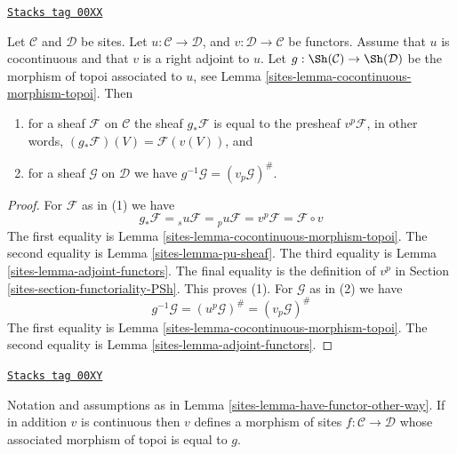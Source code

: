 \begin{lemma}
\label{sites-lemma-have-functor-other-way}
\href{https://stacks.math.columbia.edu/tag/00XX}{\texttt{Stacks tag 00XX}}

Let $\mathcal{C}$ and $\mathcal{D}$ be sites. Let
$u : \mathcal{C} \to \mathcal{D}$, and $v : \mathcal{D} \to \mathcal{C}$
be functors. Assume that $u$ is cocontinuous
and that $v$ is a right adjoint to $u$.
Let $g : \Sh(\mathcal{C}) \to \Sh(\mathcal{D})$ be
the morphism of topoi associated to $u$, see
Lemma \ref{sites-lemma-cocontinuous-morphism-topoi}.
Then
\begin{enumerate}
\item for a sheaf $\mathcal{F}$ on $\mathcal{C}$ the sheaf
$g_*\mathcal{F}$ is equal to the presheaf $v^p\mathcal{F}$, in other words,
$(g_*\mathcal{F})(V) = \mathcal{F}(v(V))$, and
\item for a sheaf $\mathcal{G}$ on $\mathcal{D}$ we have
$g^{-1}\mathcal{G} = (v_p\mathcal{G})^\#$.
\end{enumerate}
\end{lemma}

\begin{proof}

For $\mathcal{F}$ as in (1) we have
$$
g_*\mathcal{F} =
{}_su\mathcal{F} =
{}_pu\mathcal{F} =
v^p\mathcal{F} =
\mathcal{F} \circ v
$$
The first equality is Lemma \ref{sites-lemma-cocontinuous-morphism-topoi}.
The second equality is Lemma \ref{sites-lemma-pu-sheaf}.
The third equality is Lemma \ref{sites-lemma-adjoint-functors}.
The final equality is the definition of $v^p$ in
Section \ref{sites-section-functoriality-PSh}. This proves (1).
For $\mathcal{G}$ as in (2) we have
$$
g^{-1}\mathcal{G} = (u^p\mathcal{G})^\# = (v_p\mathcal{G})^\#
$$
The first equality is Lemma \ref{sites-lemma-cocontinuous-morphism-topoi}.
The second equality is Lemma \ref{sites-lemma-adjoint-functors}.
\end{proof}

\begin{lemma}
\label{sites-lemma-have-functor-other-way-morphism}
\href{https://stacks.math.columbia.edu/tag/00XY}{\texttt{Stacks tag 00XY}}

Notation and assumptions as in Lemma \ref{sites-lemma-have-functor-other-way}.
If in addition $v$ is continuous then $v$ defines a morphism of sites
$f : \mathcal{C} \to \mathcal{D}$ whose associated morphism
of topoi is equal to $g$.
\end{lemma}

